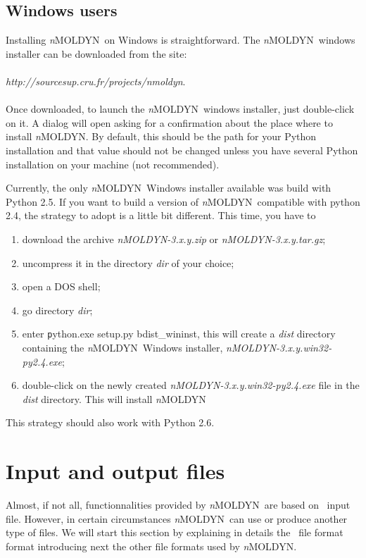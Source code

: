 \documentclass[a4paper,11pt]{report}
\newcommand{\NMOLDYN}{\textit{n}MOLDYN}
\begin{document}
\section{Windows users}
\label{window_users}
Installing \NMOLDYN\ on Windows is straightforward. The \NMOLDYN\ windows installer can be downloaded from the site:
\\\\
{\itshape http://sourcesup.cru.fr/projects/nmoldyn}.
\\\\
Once downloaded, to launch the \NMOLDYN\ windows installer, just double-click on it. A dialog will open asking for a confirmation about the 
place where to install \NMOLDYN. By default, this should be the path for your Python installation and that value should not 
be changed unless you have several Python installation on your machine (not recommended).

Currently, the only \NMOLDYN\ Windows installer available was build with Python 2.5. If you want to build a version of 
\NMOLDYN\ compatible with python 2.4, the strategy to adopt is a little bit different. This time, you have to
\begin{enumerate}
\item download the archive \textit{nMOLDYN-3.x.y.zip} or \textit{nMOLDYN-3.x.y.tar.gz};
\item uncompress it in the directory \textit{dir} of your choice;
\item open a DOS shell;
\item go directory \textit{dir};
\item enter {\texttt python.exe setup.py bdist\_wininst}, this will create a \textit{dist} directory containing 
the \NMOLDYN\ Windows installer, \textit{nMOLDYN-3.x.y.win32-py2.4.exe};
\item{double-click on the newly created \textit{nMOLDYN-3.x.y.win32-py2.4.exe} file in the \textit{dist} directory. This 
will install \NMOLDYN}
\end{enumerate}
This strategy should also work with Python 2.6.

\chapter{Input and output files}
\label{input_and_output_files}
Almost, if not all, functionnalities provided by \NMOLDYN\ are based on \NetCDF\ input file. However, in 
certain circumstances \NMOLDYN\ can use or produce another type of files. We will start this section by 
explaining in details the \NetCDF\ file format format introducing next the other file formats used by \NMOLDYN.
\end{document}
